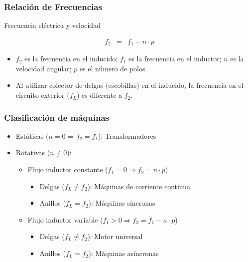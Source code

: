 \documentclass[serif, xcolor=dvipsnames]{beamer}
\begin{document}
\begin{frame}
  \frametitle{Relación de Frecuencias}
  \begin{block} {Frecuencia eléctrica y velocidad}

\begin{eqnarray*}
  f_{2} & = & f_{1}-n\cdot p
\end{eqnarray*}

\begin{itemize}
\item $f_{2}$ es la frecuencia en el inducido; $f_{1}$ es la
  frecuencia en el inductor; $n$ es la velocidad angular; $p$ es el
  número de polos.
\item Al utilizar colector de delgas (escobillas) en el inducido, la
  frecuencia en el circuito exterior ($f_{L}$) es diferente a $f_{2}$.
\end{itemize}
\end{block}

\end{frame}
\begin{frame}
  \frametitle{Clasificación de máquinas}
  \begin{itemize}
  \item Estáticas ($n=0\Rightarrow f_{2}=f_{1}$): Transformadores
  \item Rotativas ($n\neq0$):

    \begin{itemize}
    \item Flujo inductor constante ($f_{1}=0\Rightarrow f_{2}=n\cdot
      p$)

      \begin{itemize}
      \item Delgas ($f_{L}\neq f_{2}$): Máquinas de corriente continua
      \item Anillos ($f_{L}=f_{2}$): Máquinas síncronas
      \end{itemize}
    \item Flujo inductor variable ($f_{1}>0\Rightarrow
      f_{2}=f_{1}-n\cdot p$)

      \begin{itemize}
      \item Delgas ($f_{L}\neq f_{2}$): Motor universal
      \item Anillos ($f_{L}=f_{2}$): Máquinas asíncronas
      \end{itemize}
    \end{itemize}
  \end{itemize}

\end{frame}
\end{document}
